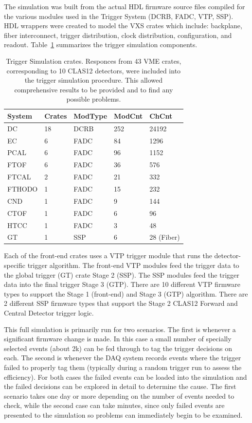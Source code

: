 The simulation was built from the actual HDL firmware source files compiled for the various modules used in the Trigger System (DCRB, FADC, VTP, SSP). HDL wrappers were created to model the VXS crates which include: backplane, fiber interconnect, trigger distribution, clock distribution, configuration, and readout. Table~\ref{tab:trig_sim_crates} summarizes the trigger simulation components.

\begin{table}
\begin{center}
	\begin{tabular}{| l | l | l | l | l |}
		\hline \hline
		System		& Crates	& ModType	& ModCnt	& ChCnt		\\
		\hline
		DC			& 18		& DCRB		& 252		& 24192		\\
		EC		& 6			& FADC		& 84		& 1296	 	\\
		PCAL		& 6			& FADC		& 96		& 1152	 	\\
		FTOF		& 6			& FADC		& 36		& 576	 	\\
		FTCAL		& 2			& FADC		& 21		& 332	 	\\
		FTHODO		& 1			& FADC		& 15		& 232	 	\\
		CND			& 1			& FADC		& 9			& 144	 	\\
		CTOF		& 1			& FADC		& 6			& 96	 	\\
		HTCC		& 1			& FADC		& 3			& 48	 	\\
		GT			& 1			& SSP		& 6			& 28 (Fiber)	\\
		\hline \hline
	\end{tabular}
\end{center}
\caption{Trigger Simulation crates. Responces from 43 VME crates, corresponding to 10 CLAS12 detectors, were included into the trigger simulation procedure. This allowed comprehensive results to be provided and to find any possible problems.}
\label{tab:trig_sim_crates}
\end{table}

Each of the front-end crates uses a VTP trigger module that runs the detector-specific trigger algorithm. The front-end VTP modules feed the trigger data to the global trigger (GT) crate Stage 2 (SSP). The SSP modules feed the trigger data into the final trigger Stage 3 (GTP). There are 10 different VTP firmware types to support the Stage 1 (front-end) and Stage 3 (GTP) algorithm. There are 2 different SSP firmware types that support the Stage 2 CLAS12 Forward and Central Detector trigger logic.

This full simulation is primarily run for two scenarios. The first is whenever a significant firmware change is made. In this case a small number of specially selected events (about 2k) can be fed through to tag the trigger decisions on each. The second is whenever the DAQ system records events where the trigger failed to properly tag them (typically during a random trigger run to assess the efficiency). For both cases the failed events can be loaded into the simulation and the failed decisions can be explored in detail to determine the cause. The first scenario takes one day or more depending on the number of events needed to check, while the second case can take minutes, since only failed events are presented to the simulation so problems can immediately begin to be examined.